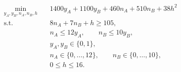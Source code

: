 \[
\begin{aligned}
\min_{y_A,y_B,n_A,n_B,h}\quad
  & 1400y_A + 1100y_B + 460n_A + 510n_B + 38h^2 \\
\mathrm{s.t.}\quad
  & 8n_A + 7n_B + h \ge 105, \\
  & n_A \le 12y_A,\qquad n_B \le 10y_B, \\
  & y_A,y_B\in\{0,1\}, \\
  & n_A\in\{0,\ldots,12\},\qquad n_B\in\{0,\ldots,10\}, \\
  & 0\le h\le16.
\end{aligned}
\]
